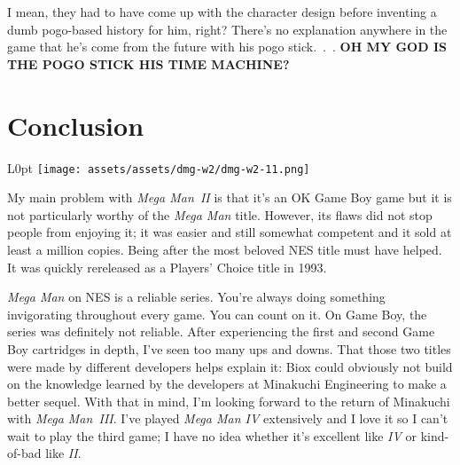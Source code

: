 \documentclass{book}
\let\oldcenter\center
\let\oldendcenter\endcenter
\renewenvironment{center}{\setlength\topsep{0pt}\oldcenter}{\oldendcenter}
\begin{document}
I mean, they had to have come up with the character design before inventing a dumb pogo-based history for him, right? There’s no explanation anywhere in the game that he’s come from the future with his pogo stick. . . \textbf{OH MY GOD IS THE POGO STICK HIS TIME MACHINE?}

\begin{center}
\vspace{8pt}
\quad\vspace{4pt}
\quad\vspace{4pt}
\end{center}

\FloatBarrier\needspace{10mm}\section*{Conclusion}\nopagebreak[4]

\begin{wrapfigure}{L}{0pt} \texttt{[image: assets/assets/dmg-w2/dmg-w2-11.png]}\end{wrapfigure}
My main problem with \emph{Mega Man II} is that it’s an OK Game Boy game but it is not particularly worthy of the \emph{Mega Man} title. However, its flaws did not stop people from enjoying it; it was easier and still somewhat competent and it sold at least a million copies. Being after the most beloved NES title must have helped. It was quickly rereleased as a Players’ Choice title in 1993.

\emph{Mega Man} on NES is a reliable series. You’re always doing something invigorating throughout every game. You can count on it. On Game Boy, the series was definitely not reliable. After experiencing the first and second Game Boy cartridges in depth, I’ve seen too many ups and downs. That those two titles were made by different developers helps explain it: Biox could obviously not build on the knowledge learned by the developers at Minakuchi Engineering to make a better sequel. With that in mind, I’m looking forward to the return of Minakuchi with \emph{Mega Man III}. I’ve played \emph{Mega Man IV} extensively and I love it so I can’t wait to play the third game; I have no idea whether it’s excellent like \emph{IV} or kind-of-bad like \emph{II}.
\end{document}
